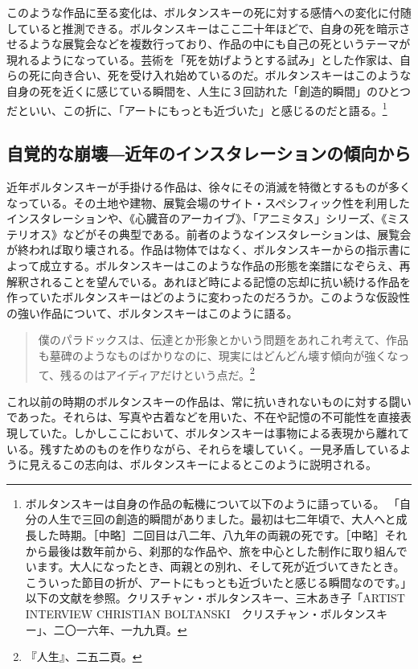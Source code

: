 \documentclass[b5j,twoside,twocolumn]{utarticle}
\begin{document}
このような作品に至る変化は、ボルタンスキーの死に対する感情への変化に付随していると推測できる。ボルタンスキーはここ二十年ほどで、自身の死を暗示させるような展覧会などを複数行っており、作品の中にも自己の死というテーマが現れるようになっている。芸術を「死を妨げようとする試み」とした作家は、自らの死に向き合い、死を受け入れ始めているのだ。ボルタンスキーはこのような自身の死を近くに感じている瞬間を、人生に３回訪れた「創造的瞬間」のひとつだといい、この折に、「アートにもっとも近づいた」と感じるのだと語る。\footnote{ボルタンスキーは自身の作品の転機について以下のように語っている。
「自分の人生で三回の創造的瞬間がありました。最初は七二年頃で、大人へと成長した時期。［中略］二回目は八二年、八九年の両親の死です。［中略］それから最後は数年前から、刹那的な作品や、旅を中心とした制作に取り組んでいます。大人になったとき、両親との別れ、そして死が近づいてきたとき。こういった節目の折が、アートにもっとも近づいたと感じる瞬間なのです。」以下の文献を参照。クリスチャン・ボルタンスキー、三木あき子「ARTIST INTERVIEW CHRISTIAN BOLTANSKI　クリスチャン・ボルタンスキー」、二〇一六年、一九九頁。}

\subsection{自覚的な崩壊―近年のインスタレーションの傾向から}
近年ボルタンスキーが手掛ける作品は、徐々にその消滅を特徴とするものが多くなっている。その土地や建物、展覧会場のサイト・スペシフィック性を利用したインスタレーションや、《心臓音のアーカイブ》、「アニミタス」シリーズ、《ミステリオス》などがその典型である。前者のようなインスタレーションは、展覧会が終われば取り壊される。作品は物体ではなく、ボルタンスキーからの指示書によって成立する。ボルタンスキーはこのような作品の形態を楽譜になぞらえ、再解釈されることを望んでいる。あれほど時による記憶の忘却に抗い続ける作品を作っていたボルタンスキーはどのように変わったのだろうか。このような仮設性の強い作品について、ボルタンスキーはこのように語る。

\begin{quote}
僕のパラドックスは、伝達とか形象とかいう問題をあれこれ考えて、作品も墓碑のようなものばかりなのに、現実にはどんどん壊す傾向が強くなって、残るのはアイディアだけという点だ。\footnote{『人生』、二五二頁。}
\end{quote}


これ以前の時期のボルタンスキーの作品は、常に抗いきれないものに対する闘いであった。それらは、写真や古着などを用いた、不在や記憶の不可能性を直接表現していた。しかしここにおいて、ボルタンスキーは事物による表現から離れている。残すためのものを作りながら、それらを壊していく。一見矛盾しているように見えるこの志向は、ボルタンスキーによるとこのように説明される。
\end{document}
